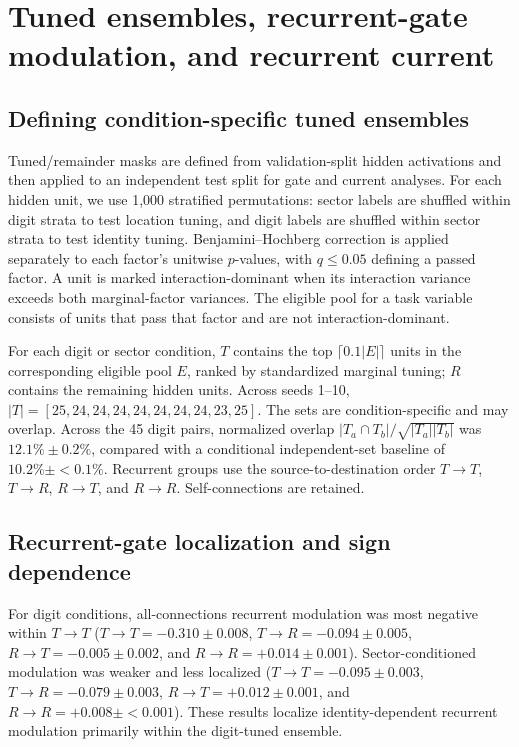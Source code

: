 \section{Tuned ensembles, recurrent-gate modulation, and recurrent current}
\label{app:recurrent-gate}

\subsection{Defining condition-specific tuned ensembles}

Tuned/remainder masks are defined from validation-split hidden activations and then applied to an independent test split for gate and current analyses. For each hidden unit, we use 1,000 stratified permutations: sector labels are shuffled within digit strata to test location tuning, and digit labels are shuffled within sector strata to test identity tuning. Benjamini--Hochberg correction is applied separately to each factor's unitwise \(p\)-values, with \(q\leq0.05\) defining a passed factor. A unit is marked interaction-dominant when its interaction variance exceeds both marginal-factor variances. The eligible pool for a task variable consists of units that pass that factor and are not interaction-dominant.

For each digit or sector condition, \(T\) contains the top \(\lceil0.1|E|\rceil\) units in the corresponding eligible pool \(E\), ranked by standardized marginal tuning; \(R\) contains the remaining hidden units. Across seeds 1--10, \(|T|=[25,24,24,24,24,24,24,24,23,25]\). The sets are condition-specific and may overlap. Across the 45 digit pairs, normalized overlap \(|T_a\cap T_b|/\sqrt{|T_a||T_b|}\) was \(12.1\%\pm0.2\%\), compared with a conditional independent-set baseline of \(10.2\%\pm{<}0.1\%\). Recurrent groups use the source-to-destination order \(T\!\to\!T\), \(T\!\to\!R\), \(R\!\to\!T\), and \(R\!\to\!R\). Self-connections are retained.

\subsection{Recurrent-gate localization and sign dependence}

For digit conditions, all-connections recurrent modulation was most negative within \(T\!\to\!T\) (\(T\!\to\!T=-0.310\pm0.008\), \(T\!\to\!R=-0.094\pm0.005\), \(R\!\to\!T=-0.005\pm0.002\), and \(R\!\to\!R=+0.014\pm0.001\)). Sector-conditioned modulation was weaker and less localized (\(T\!\to\!T=-0.095\pm0.003\), \(T\!\to\!R=-0.079\pm0.003\), \(R\!\to\!T=+0.012\pm0.001\), and \(R\!\to\!R=+0.008\pm{<}0.001\)). These results localize identity-dependent recurrent modulation primarily within the digit-tuned ensemble.

